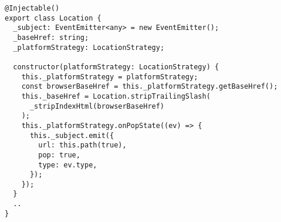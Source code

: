 \begin{verbatim}
@Injectable()
export class Location {
  _subject: EventEmitter<any> = new EventEmitter();
  _baseHref: string;
  _platformStrategy: LocationStrategy;

  constructor(platformStrategy: LocationStrategy) {
    this._platformStrategy = platformStrategy;
    const browserBaseHref = this._platformStrategy.getBaseHref();
    this._baseHref = Location.stripTrailingSlash(
      _stripIndexHtml(browserBaseHref)
    );
    this._platformStrategy.onPopState((ev) => {
      this._subject.emit({
        url: this.path(true),
        pop: true,
        type: ev.type,
      });
    });
  }
  ..
}
\end{verbatim}
